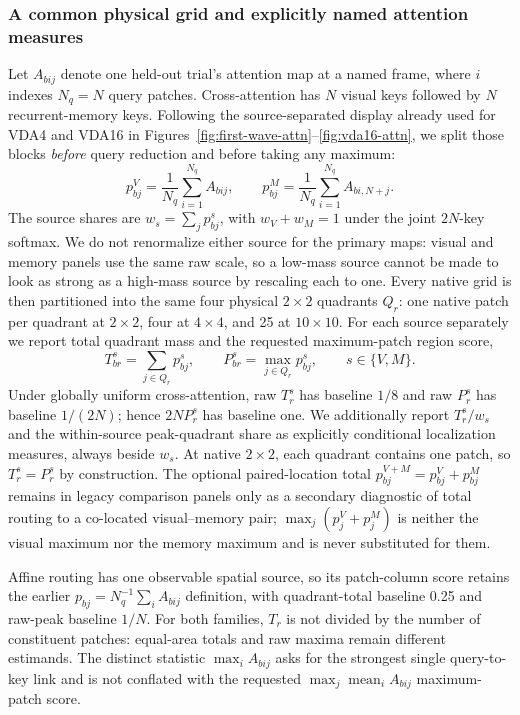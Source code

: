 \documentclass[10pt]{article}
\begin{document}
\subsubsection{A common physical grid and explicitly named attention measures}
Let $A_{bij}$ denote one held-out trial's attention map at a named frame, where $i$ indexes $N_q=N$ query patches. Cross-attention has $N$ visual keys followed by $N$ recurrent-memory keys. Following the source-separated display already used for VDA4 and VDA16 in Figures~\ref{fig:first-wave-attn}--\ref{fig:vda16-attn}, we split those blocks \emph{before} query reduction and before taking any maximum:
\begin{equation}
 p^{V}_{bj}=\frac{1}{N_q}\sum_{i=1}^{N_q}A_{bij},
 \qquad
 p^{M}_{bj}=\frac{1}{N_q}\sum_{i=1}^{N_q}A_{bi,N+j}.
\end{equation}
The source shares are $w_s=\sum_jp^s_{bj}$, with $w_V+w_M=1$ under the joint $2N$-key softmax. We do not renormalize either source for the primary maps: visual and memory panels use the same raw scale, so a low-mass source cannot be made to look as strong as a high-mass source by rescaling each to one. Every native grid is then partitioned into the same four physical $2\times2$ quadrants $Q_r$: one native patch per quadrant at $2\times2$, four at $4\times4$, and 25 at $10\times10$. For each source separately we report total quadrant mass and the requested maximum-patch region score,
\begin{equation}
 T^s_{br}=\sum_{j\in Q_r}p^s_{bj},
 \qquad P^s_{br}=\max_{j\in Q_r}p^s_{bj},
 \qquad s\in\{V,M\}.
\end{equation}
Under globally uniform cross-attention, raw $T^s_r$ has baseline $1/8$ and raw $P^s_r$ has baseline $1/(2N)$; hence $2NP^s_r$ has baseline one. We additionally report $T^s_r/w_s$ and the within-source peak-quadrant share as explicitly conditional localization measures, always beside $w_s$. At native $2\times2$, each quadrant contains one patch, so $T^s_r=P^s_r$ by construction. The optional paired-location total $p^{V+M}_{bj}=p^V_{bj}+p^M_{bj}$ remains in legacy comparison panels only as a secondary diagnostic of total routing to a co-located visual--memory pair; $\max_j(p^V_j+p^M_j)$ is neither the visual maximum nor the memory maximum and is never substituted for them.

Affine routing has one observable spatial source, so its patch-column score retains the earlier $p_{bj}=N_q^{-1}\sum_iA_{bij}$ definition, with quadrant-total baseline 0.25 and raw-peak baseline $1/N$. For both families, $T_r$ is not divided by the number of constituent patches: equal-area totals and raw maxima remain different estimands. The distinct statistic $\max_iA_{bij}$ asks for the strongest single query-to-key link and is not conflated with the requested $\max_j\operatorname{mean}_i A_{bij}$ maximum-patch score.
\end{document}
